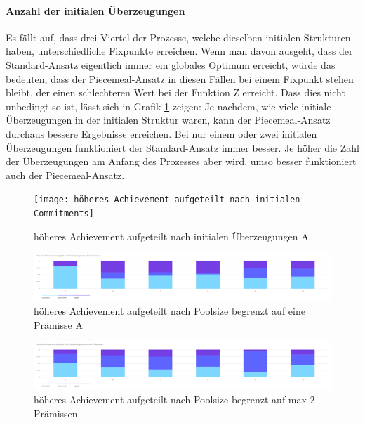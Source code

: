 \documentclass{article}
\begin{document}
\paragraph{Anzahl der initialen Überzeugungen} Es fällt auf, dass drei Viertel der Prozesse, welche dieselben initialen Strukturen haben, unterschiedliche Fixpunkte erreichen. Wenn man davon ausgeht, dass der Standard-Ansatz eigentlich immer ein globales Optimum erreicht, würde das bedeuten, dass der Piecemeal-Ansatz in diesen Fällen bei einem Fixpunkt stehen bleibt, der einen schlechteren Wert bei der Funktion Z erreicht. Dass dies nicht unbedingt so ist, lässt sich in Grafik \ref{fig:höheres Achievement aufgeteilt nach initialen Commitments} zeigen: Je nachdem, wie viele initiale Überzeugungen in der initialen Struktur waren, kann der Piecemeal-Ansatz durchaus bessere Ergebnisse erreichen. Bei nur einem oder zwei initialen Überzeugungen funktioniert der Standard-Ansatz immer besser. Je höher die Zahl der Überzeugungen am Anfang des Prozesses aber wird, umso besser funktioniert auch der Piecemeal-Ansatz.

\begin{figure}[ht]
  \centering
  \texttt{[image: höheres Achievement aufgeteilt nach initialen Commitments]}
  \caption{höheres Achievement aufgeteilt nach initialen Überzeugungen A\label{fig:höheres Achievement aufgeteilt nach initialen Commitments}}
\end{figure}

\begin{figure}[ht]
  \centering
  \includegraphics[width=\textwidth]{höheres Achievement aufgeteilt nach Poolsize begrenzt auf eine Prämisse}
  \caption{höheres Achievement aufgeteilt nach Poolsize begrenzt auf eine Prämisse A\label{fig:höheres Achievement aufgeteilt nach Poolsize begrenzt auf eine Prämisse}}
\end{figure}

\begin{figure}[ht]
  \centering
  \includegraphics[width=\textwidth]{höheres Achievement aufgeteilt nach Poolsize begrenzt auf max 2 Prämissen}
  \caption{höheres Achievement aufgeteilt nach Poolsize begrenzt auf max 2 Prämissen\label{fig:höheres Achievement aufgeteilt nach Poolsize begrenzt auf max 2 Prämissen}}
\end{figure}
\end{document}
